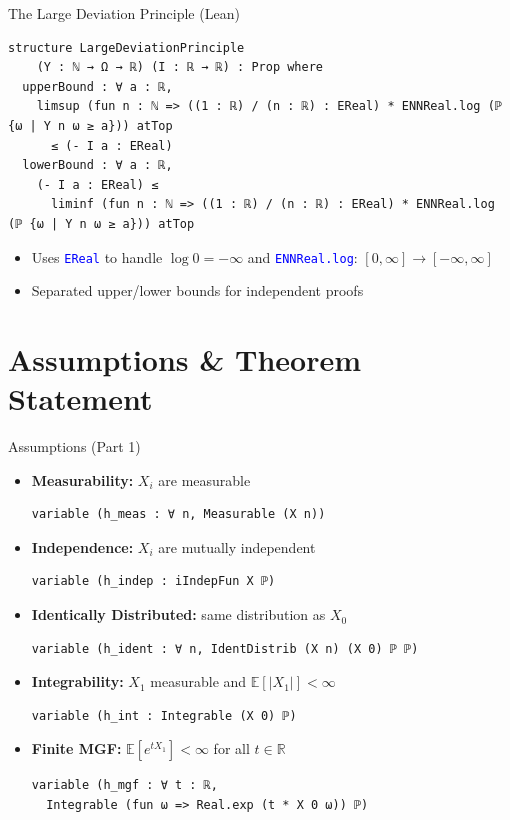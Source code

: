 \documentclass[aspectratio=169]{beamer}
\newcommand{\E}{\mathbb{E}}
\newcommand{\R}{\mathbb{R}}
\newcommand{\leancode}[1]{\textcolor{blue}{\nolinkurl{#1}}}
\begin{document}
\begin{frame}[fragile]{The Large Deviation Principle (Lean)}
\begin{lstlisting}[basicstyle=\ttfamily\scriptsize]
structure LargeDeviationPrinciple
    (Y : ℕ → Ω → ℝ) (I : ℝ → ℝ) : Prop where
  upperBound : ∀ a : ℝ,
    limsup (fun n : ℕ => ((1 : ℝ) / (n : ℝ) : EReal) * ENNReal.log (ℙ {ω | Y n ω ≥ a})) atTop
      ≤ (- I a : EReal)
  lowerBound : ∀ a : ℝ,
    (- I a : EReal) ≤
      liminf (fun n : ℕ => ((1 : ℝ) / (n : ℝ) : EReal) * ENNReal.log (ℙ {ω | Y n ω ≥ a})) atTop
\end{lstlisting}
  \vspace{0.2cm}
  \begin{itemize}
    \item Uses \leancode{EReal} to handle $\log 0 = -\infty$ and \leancode{ENNReal.log}: $[0, \infty] \to [-\infty, \infty]$
    \item Separated upper/lower bounds for independent proofs
  \end{itemize}
\end{frame}

\section{Assumptions \& Theorem Statement}

\begin{frame}[fragile]{Assumptions (Part 1)}
  \begin{itemize}
    \item \textbf{Measurability:} $X_i$ are measurable
\begin{lstlisting}[basicstyle=\ttfamily\scriptsize]
variable (h_meas : ∀ n, Measurable (X n))
\end{lstlisting}
    \item \textbf{Independence:} $X_i$ are mutually independent
\begin{lstlisting}[basicstyle=\ttfamily\scriptsize]
variable (h_indep : iIndepFun X ℙ)
\end{lstlisting}
    \item \textbf{Identically Distributed:} same distribution as $X_0$
\begin{lstlisting}[basicstyle=\ttfamily\scriptsize]
variable (h_ident : ∀ n, IdentDistrib (X n) (X 0) ℙ ℙ)
\end{lstlisting}
    \item \textbf{Integrability:} $X_1$ measurable and $\E[|X_1|] < \infty$
\begin{lstlisting}[basicstyle=\ttfamily\scriptsize]
variable (h_int : Integrable (X 0) ℙ)
\end{lstlisting}
    \item \textbf{Finite MGF:} $\E[e^{tX_1}] < \infty$ for all $t \in \R$
\begin{lstlisting}[basicstyle=\ttfamily\scriptsize]
variable (h_mgf : ∀ t : ℝ,
  Integrable (fun ω => Real.exp (t * X 0 ω)) ℙ)
\end{lstlisting}
  \end{itemize}
\end{frame}
\end{document}
